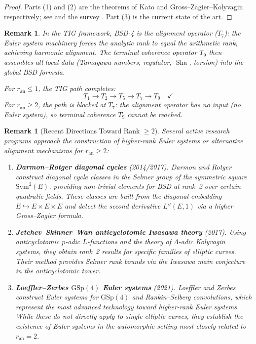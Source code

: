 \documentclass[11pt]{article}
\newtheorem{remark}[theorem]{Remark}
\DeclareMathOperator{\Sha}{Sha}
\begin{document}
\begin{proof}
Parts (1) and (2) are the theorems of Kato and Gross--Zagier--Kolyvagin
respectively; see \cite{Kato, GZ, Koly} and the survey \cite{Coa}.
Part (3) is the current state of the art.
\end{proof}

\begin{remark}
\label{rem:T7-alignment}
In the TIG framework, BSD-4 is the \emph{alignment operator} ($T_7$): the
Euler system machinery forces the analytic rank to equal the arithmetic rank,
achieving harmonic alignment.  The terminal coherence operator $T_9$ then
assembles all local data (Tamagawa numbers, regulator, $\Sha$, torsion) into
the global BSD formula.

For $r_{\mathrm{an}} \leq 1$, the TIG path completes:
\[
  T_1 \to T_2 \to T_5 \to T_7 \to T_9 \quad\checkmark
\]
For $r_{\mathrm{an}} \geq 2$, the path is blocked at $T_7$: the alignment
operator has no input (no Euler system), so terminal coherence $T_9$ cannot be
reached.
\end{remark}

\begin{remark}[Recent Directions Toward Rank $\geq 2$]
\label{rem:rank2-progress}
Several active research programs approach the construction of higher-rank
Euler systems or alternative alignment mechanisms for $r_{\mathrm{an}} \geq 2$:

\begin{enumerate}
  \item \textbf{Darmon--Rotger diagonal cycles} \cite{DR} (2014/2017).
    Darmon and Rotger construct diagonal cycle classes in the Selmer group of
    the symmetric square $\mathrm{Sym}^2(E)$, providing non-trivial elements
    for BSD at rank~2 over certain quadratic fields.  These classes are built
    from the diagonal embedding $E \hookrightarrow E \times E \times E$ and
    detect the second derivative $L''(E,1)$ via a higher Gross--Zagier formula.

  \item \textbf{Jetchev--Skinner--Wan anticyclotomic Iwasawa theory}
    \cite{JSW} (2017).  Using anticyclotomic $p$-adic $L$-functions and the
    theory of $\Lambda$-adic Kolyvagin systems, they obtain rank~2 results for
    specific families of elliptic curves.  Their method provides Selmer rank
    bounds via the Iwasawa main conjecture in the anticyclotomic tower.

  \item \textbf{Loeffler--Zerbes $\mathrm{GSp}(4)$ Euler systems} \cite{LZ}
    (2021).  Loeffler and Zerbes construct Euler systems for
    $\mathrm{GSp}(4)$ and Rankin--Selberg convolutions, which represent the
    most advanced technology toward higher-rank Euler systems.  While these do
    not directly apply to single elliptic curves, they establish the existence
    of Euler systems in the automorphic setting most closely related to
    $r_{\mathrm{an}} = 2$.
\end{enumerate}
\end{remark}
\end{document}
